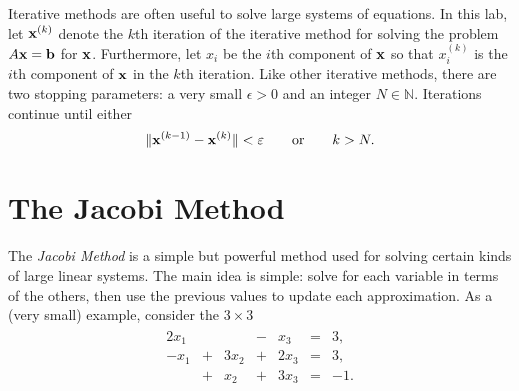 \label{lab:iter_methods}



Iterative methods are often useful to solve large systems of equations.
In this lab, let $\mathbf{x}^{(k)}$ denote the $k$th iteration of the iterative method for solving the problem $A\mathbf{x}=\mathbf{b}$ for $\mathbf{x}$.
Furthermore, let $x_{i}$ be the $i$th component of $\mathbf{x}$ so that $x_{i}^{(k)}$ is the $i$th component of $\mathbf{x}$ in the $k$th iteration.
Like other iterative methods, there are two stopping parameters: a very small $\epsilon > 0$ and an integer $N\in\mathbb{N}$.
Iterations continue until either
\begin{equation} %
\|\x^{(k-1)}-\x^{(k)}\| < \epsilon
\qquad \text{or} \qquad
k > N.
\label{eq:itersolve-stopping-criteria}
\end{equation}

\section*{The Jacobi Method} %

The \emph{Jacobi Method} is a simple but powerful method used for solving certain kinds of large linear systems.
The main idea is simple: solve for each variable in terms of the others, then use the previous values to update each approximation.
As a (very small) example, consider the $3 \times 3$
\begin{align*}
\begin{array}{ccccccr}
  2x_1 &   &      & - & x_3  & = & 3,  \\
  -x_1 & + & 3x_2 & + & 2x_3 & = & 3,  \\
       & + & x_2  & + & 3x_3 & = & -1. \\
\end{array}
\end{align*}


